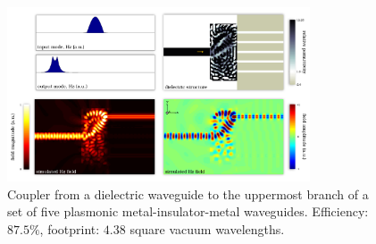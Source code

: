\begin{figure}[h!]
    \centering
    \includegraphics[width=0.8\textwidth]{p3/21}
    \caption{
        Coupler from a dielectric waveguide to the 
            uppermost branch of a set of five plasmonic 
            metal-insulator-metal waveguides.
        Efficiency: $87.5\%$,
        footprint: $4.38$ square vacuum wavelengths.
        }
\end{figure}
\clearpage

